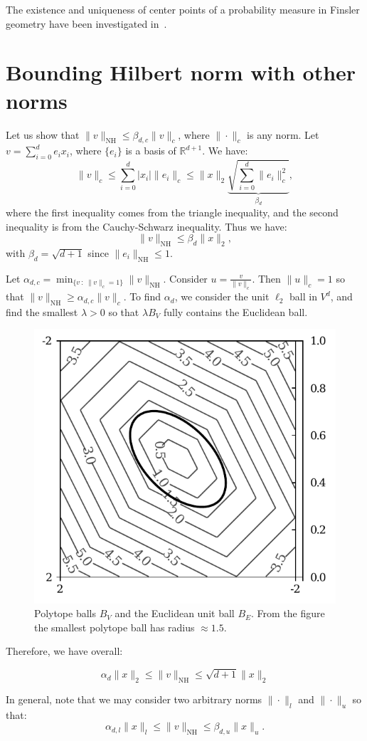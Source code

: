 \documentclass[graybox]{svmult}
\def\bbR{\mathbb{R}}
\def\st{\ :\ }
\def\NH{\mathrm{NH}}  %
\begin{document}
The existence and uniqueness of center points of a probability measure in Finsler geometry have been investigated in~\cite{FinslerCenter-2012}.

\section{Bounding Hilbert norm with other norms}
Let us show that $\|v\|_\NH\leq \beta_{d,c} \|v\|_c$, where $\|\cdot\|_c$ 
is any norm.
Let $v=\sum_{i=0}^{d} e_i x_i$, where $\{e_i\}$ is a basis of $\bbR^{d+1}$.
We have:
$$
\|v\|_c \leq \sum_{i=0}^{d} |x_i|  \|e_i\|_c \leq \|x\|_2 
\underbrace{\sqrt{\sum_{i=0}^{d} \|e_i\|^2_c}}_{\beta_d},
$$
where the first inequality comes from the triangle inequality, and the 
second inequality is from the Cauchy-Schwarz inequality.
Thus we have:
$$
\|v\|_\NH \leq \beta_d \|x\|_2,
$$
with $\beta_d=\sqrt{d+1}$ since $\|e_i\|_\NH\leq 1$.

Let $\alpha_{d,c}=\min_{\{v \st \|v\|_c = 1\}} \|v\|_\NH$.
Consider $u=\frac{v}{\|v\|_c}$. Then $\|u\|_c=1$ so that $\|v\|_\NH\geq 
\alpha_{d,c} \|v\|_c$.
To find $\alpha_d$, we consider the unit $\ell_2$ ball in $V^d$, and 
find the smallest $\lambda>0$ so that
$\lambda B_V$ fully contains the Euclidean ball.

\begin{figure}[b]
\centering
\includegraphics[width=.5\textwidth]{boundnorm}
\caption{Polytope balls $B_V$ and the Euclidean unit ball $B_E$.
From the figure the smallest polytope ball has radius $\approx1.5$.}
\end{figure}

Therefore, we have overall:

$$
\alpha_d \|x\|_2 \leq \|v\|_\NH \leq \sqrt{d+1} \|x\|_2
$$

In general, note that we may consider two arbitrary norms $\|\cdot\|_l$ 
and $\|\cdot\|_u$ so that:
$$
\alpha_{d,l} \|x\|_l \leq \|v\|_\NH \leq \beta_{d,u} \|x\|_u.
$$
\end{document}
